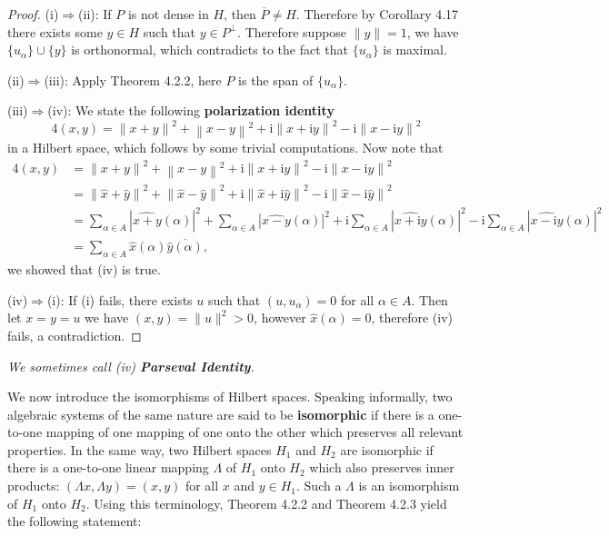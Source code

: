 \begin{proof}
(i)$\Rightarrow$(ii): If $P$ is not dense in $H$, then $\overline{P}\ne H$. Therefore by Corollary 4.17 there exists some $y\in H$ such that $y\in P^\perp$. Therefore suppose $\|y\|=1$, we have $\{u_\alpha\}\cup\{y\}$ is orthonormal, which contradicts to the fact that $\{u_\alpha\}$ is maximal.\par
(ii)$\Rightarrow$(iii): Apply Theorem 4.2.2, here $P$ is the span of $\{u_\alpha\}$.\par
(iii)$\Rightarrow$(iv): We state the following \textbf{polarization identity}
$$
4\left( x,y \right) =\left\| x+y \right\| ^2+\left\| x-y \right\| ^2+\mathrm{i}\left\| x+\mathrm{i}y \right\| ^2-\mathrm{i}\left\| x-\mathrm{i}y \right\| ^2
$$
in a Hilbert space, which follows by some trivial computations. Now note that 
$$
\begin{aligned}
4\left( x,y \right) &=\left\| x+y \right\| ^2+\left\| x-y \right\| ^2+\mathrm{i}\left\| x+\mathrm{i}y \right\| ^2-\mathrm{i}\left\| x-\mathrm{i}y \right\| ^2
\\
&=\left\| \widehat{x}+\widehat{y} \right\| ^2+\left\| \widehat{x}-\widehat{y} \right\| ^2+\mathrm{i}\left\| \widehat{x}+\mathrm{i}\widehat{y} \right\| ^2-\mathrm{i}\left\| \widehat{x}-\mathrm{i}\widehat{y} \right\| ^2
\\
&=\sum_{\alpha \in A}{\left| \widehat{x+y}\left( \alpha \right) \right|^2}+\sum_{\alpha \in A}{\left| \widehat{x-y}\left( \alpha \right) \right|^2}+\mathrm{i}\sum_{\alpha \in A}{\left| \widehat{x+\mathrm{i}y}\left( \alpha \right) \right|^2}-\mathrm{i}\sum_{\alpha \in A}{\left| \widehat{x-\mathrm{i}y}\left( \alpha \right) \right|^2}
\\
&=\sum_{\alpha \in A}{\widehat{x}\left( \alpha \right) \overline{\widehat{y}\left( \alpha \right) }},
\end{aligned}
$$
we showed that (iv) is true.\par
(iv)$\Rightarrow$(i): If (i) fails, there exists $u$ such that $(u,u_\alpha)=0$ for all $\alpha\in A$. Then let $x=y=u$ we have $(x,y)=\|u\|^2>0$, however $\widehat{x}(\alpha)=0$, therefore (iv) fails, a contradiction.
\end{proof}
\begin{note}\em
We sometimes call (iv) \textbf{Parseval Identity}.
\end{note}
We now introduce the isomorphisms of Hilbert spaces. Speaking informally, two algebraic systems of the same nature are said to be \textbf{isomorphic} if there is a one-to-one mapping of one mapping of one onto the other which preserves all relevant properties. In the same way, two Hilbert spaces $H_1$ and $H_2$ are isomorphic if there is a one-to-one linear mapping $\Lambda$ of $H_1$ onto $H_2$ which also preserves inner products: $(\Lambda x,\Lambda y)=(x,y)$ for all $x$ and $y\in H_1$. Such a $\Lambda$ is an isomorphism of $H_1$ onto $H_2$. Using this terminology, Theorem 4.2.2 and Theorem 4.2.3 yield the following statement:
